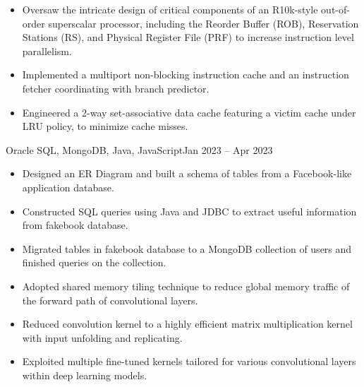 \documentclass[10pt,a4paper]{altacv}
\begin{document}
\begin{itemize}
	\item Oversaw the intricate design of critical components of an R10k-style out-of-order superscalar processor, including the Reorder Buffer (ROB), Reservation Stations (RS), and Physical Register File (PRF) to increase instruction level parallelism.
	\item Implemented a multiport non-blocking instruction cache and an instruction fetcher coordinating with branch predictor.
	\item Engineered a 2-way set-associative data cache featuring a victim cache under LRU policy, to minimize cache misses.
\end{itemize}

 {Oracle SQL, MongoDB, Java, JavaScript}{Jan 2023 -- Apr 2023}
\begin{itemize}
	\item Designed an ER Diagram and built a schema of tables from a Facebook-like application database.
	\item Constructed SQL queries using Java and JDBC to extract useful information from fakebook database.
	\item Migrated tables in fakebook database to a MongoDB collection of users and finished queries on the collection.
\end{itemize}

\begin{itemize}
	\item Adopted shared memory tiling technique to reduce global memory traffic of the forward path of convolutional layers.
	\item Reduced convolution kernel to a highly efficient matrix multiplication kernel with input unfolding and replicating.
	\item Exploited multiple fine-tuned kernels tailored for various convolutional layers within deep learning models.
\end{itemize}

\end{document}

